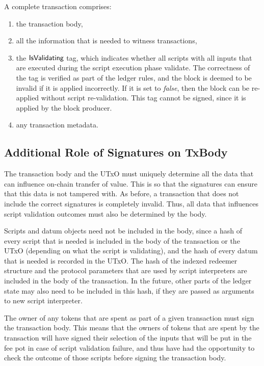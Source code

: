A complete transaction comprises:

\begin{enumerate}
  \item the transaction body,
  \item all the information that is needed to witness transactions,
  \item the $\mathsf{IsValidating}$ tag, which indicates whether all scripts with all inputs
  that are executed during the script execution phase validate.
  The correctness of the tag is verified as part of the ledger rules, and the block is
  deemed to be invalid if it is applied incorrectly.
  If it is set to \emph{false}, then the block can be re-applied without script re-validation.
  This tag cannot be signed, since it is applied by the block producer.
  \item any transaction metadata.
\end{enumerate}

\subsection{Additional Role of Signatures on TxBody}

The transaction body and the UTxO must uniquely determine all the data
that can influence on-chain transfer of value.
This is so that the signatures can ensure that this data is not tampered with.
As before, a transaction that does not include the correct signatures is completely invalid.
Thus, all data that influences script validation outcomes must also be determined by the body.

Scripts and datum objects need not be included in the body,
since a hash of every script that is needed
is included in the body of the transaction or the UTxO (depending on what the script is validating),
and the hash of every datum that is needed is recorded in the UTxO.
%
The hash of the indexed redeemer structure and the protocol parameters that are used by
script interpreters are included in the body of the transaction. In the future, other parts of the ledger
state may also need to be included in this hash, if they are passed as
arguments to new script interpreter.

The owner of any tokens that are spent as part of a given transaction
must sign the transaction body. This means that
the owners of tokens that are spent by the transaction will have
signed their selection of the inputs that will be put in the fee pot in case of script validation failure, and
thus have had the opportunity to check the outcome of those scripts before signing the transaction body.

